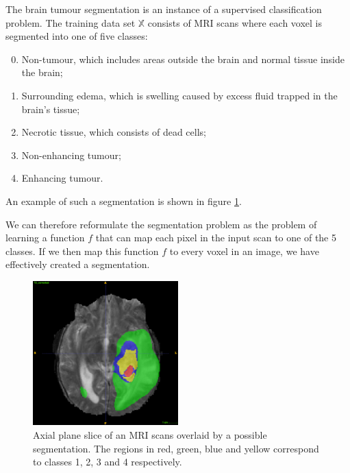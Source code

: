\documentclass[12pt,a4paper,twoside,openright]{report}
\begin{document}
The brain tumour segmentation is an instance of a supervised classification problem. The training data set $\mathbb{X}$ consists of MRI scans where each voxel is segmented into one of five classes:
\begin{enumerate}
	\setcounter{enumi}{-1}
	\item Non-tumour, which includes areas outside the brain and normal tissue inside the brain;
	\item Surrounding edema, which is swelling caused by excess fluid trapped in the brain's tissue;
	\item Necrotic tissue, which consists of dead cells;
	\item Non-enhancing tumour;
	\item Enhancing tumour.
\end{enumerate} 
An example of such a segmentation is shown in figure \ref{fig:example_segmentation}.

We can therefore reformulate the segmentation problem as the problem of learning a function $f$ that can map each pixel in the input scan to one of the 5 classes. If we then map this function $f$ to every voxel in an image, we have effectively created a segmentation.

\begin{figure}
	\centering
	\includegraphics[width = 0.5\textwidth]{challenge_1_segmentation_with_T2_66}
	\caption[Axial plane slice of an MRI scans overlaid by a possible segmentation.]{Axial plane slice of an MRI scans overlaid by a possible segmentation. The regions in red, green, blue and yellow correspond to classes 1, 2, 3 and 4 respectively. }
	\label{fig:example_segmentation}
\end{figure}
\end{document}
